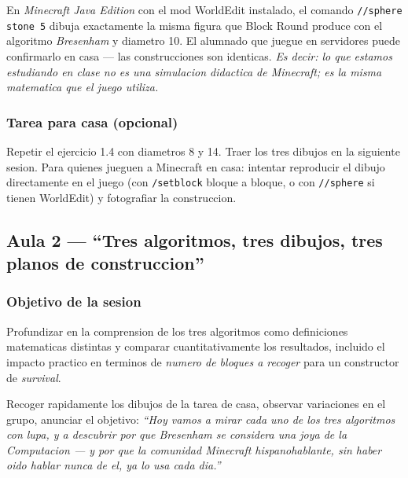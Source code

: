 \documentclass[12pt,a4paper]{scrartcl}
\newcommand{\cmd}[1]{\textcolor{earth}{\texttt{\small #1}}}
\newcommand{\tempo}[1]{\textnormal{\footnotesize\color{bg!90!white}\textsf{#1}}}
\begin{document}
\begin{minecraft}
En \emph{Minecraft Java Edition} con el mod WorldEdit instalado, el comando \cmd{//sphere stone 5} dibuja exactamente la misma figura que Block Round produce con el algoritmo \emph{Bresenham} y diametro 10. El alumnado que juegue en servidores puede confirmarlo en casa --- las construcciones son identicas. \emph{Es decir: lo que estamos estudiando en clase no es una simulacion didactica de Minecraft; es la misma matematica que el juego utiliza.}
\end{minecraft}

\subsubsection*{Tarea para casa (opcional)}
Repetir el ejercicio 1.4 con diametros 8 y 14. Traer los tres dibujos en la siguiente sesion. Para quienes jueguen a Minecraft en casa: intentar reproducir el dibujo directamente en el juego (con \cmd{/setblock} bloque a bloque, o con \cmd{//sphere} si tienen WorldEdit) y fotografiar la construccion.

\subsection{Aula 2 --- \enquote{Tres algoritmos, tres dibujos, tres planos de construccion}}\label{aula2}

\subsubsection*{Objetivo de la sesion}
Profundizar en la comprension de los tres algoritmos como definiciones matematicas distintas y comparar cuantitativamente los resultados, incluido el impacto practico en terminos de \emph{numero de bloques a recoger} para un constructor de \emph{survival}.

\begin{actividad}[2.1 --- Retomada \quad\tempo{5 min}]
Recoger rapidamente los dibujos de la tarea de casa, observar variaciones en el grupo, anunciar el objetivo: \emph{\enquote{Hoy vamos a mirar cada uno de los tres algoritmos con lupa, y a descubrir por que Bresenham se considera una joya de la Computacion --- y por que la comunidad Minecraft hispanohablante, sin haber oido hablar nunca de el, ya lo usa cada dia.}}
\end{actividad}
\end{document}
